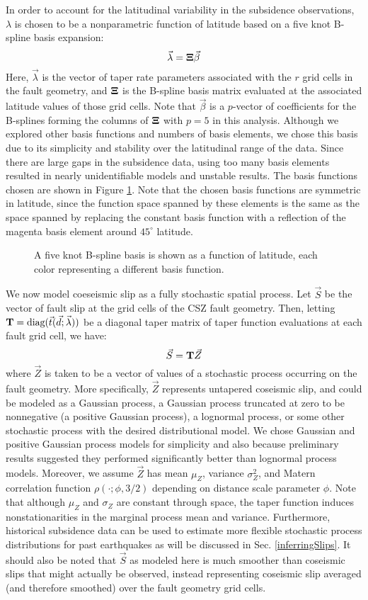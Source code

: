 {In order to account for the latitudinal variability in the subsidence observations, $\lambda$ is chosen to be a nonparametric function of latitude based on a five knot B-spline basis expansion:
$$ \vec{\lambda} = \mathbf{\Xi} \vec{\beta} $$
Here, $\vec{\lambda}$ is the vector of taper rate parameters associated with the $r$ grid cells in the fault geometry, and $\mathbf{\Xi}$ is the B-spline basis matrix evaluated at the associated latitude values of those grid cells.  Note that $\vec{\beta}$ is a $p$-vector of coefficients for the B-splines forming the columns of $\mathbf{\Xi}$ with $p=5$ in this analysis.  Although we explored other basis functions and numbers of basis elements, we chose this basis due to its simplicity and stability over the latitudinal range of the data.  Since there are large gaps in the subsidence data, using too many basis elements resulted in nearly unidentifiable models and unstable results.  The basis functions chosen are shown in Figure \ref{splineBasis}.  Note that the chosen basis functions are symmetric in latitude, since the function space spanned by these elements is the same as the space spanned by replacing the constant basis function with a reflection of the magenta basis element around $45^\circ$ latitude.

\begin{figure}
\centering
{}
\caption{A five knot B-spline basis is shown as a function of latitude, each color representing a different basis function.}
\label{splineBasis}
\end{figure}

We now model coeseismic slip as a fully stochastic spatial process.  Let $\vec{S}$ be the vector of fault slip at the grid cells of the CSZ fault geometry.  Then, letting $\mathbf{T} = \text{diag}(\vec{t}(\vec{d}; \vec{\lambda}))$ be a diagonal taper matrix of taper function evaluations at each fault grid cell, we have:
$$ \vec{S} = \mathbf{T} \vec{Z} $$
where $\vec{Z}$ is taken to be a vector of values of a stochastic process occurring on the fault geometry.  More specifically, $\vec{Z}$ represents untapered coseismic slip, and could be modeled as a Gaussian process, a Gaussian process truncated at zero to be nonnegative (a positive Gaussian process), a lognormal process, or some other stochastic process with the desired distributional model.  We chose Gaussian and positive Gaussian process models for simplicity and also because preliminary results suggested they performed significantly better than lognormal process models.  Moreover, we assume $\vec{Z}$ has mean $\mu_Z$, variance $\sigma_Z^2$, and Matern correlation function $\rho(\cdot ; \phi, 3/2)$ depending on distance scale parameter $\phi$.  Note that although $\mu_Z$ and $\sigma_Z$ are constant through space, the taper function induces nonstationarities in the marginal process mean and variance.  Furthermore, historical subsidence data can be used to estimate more flexible stochastic process distributions for past earthquakes as will be discussed in Sec. \ref{inferringSlips}.  It should also be noted that $\vec{S}$ as modeled here is much smoother than coseismic slips that might actually be observed, instead representing coseismic slip averaged (and therefore smoothed) over the fault geometry grid cells.

}
